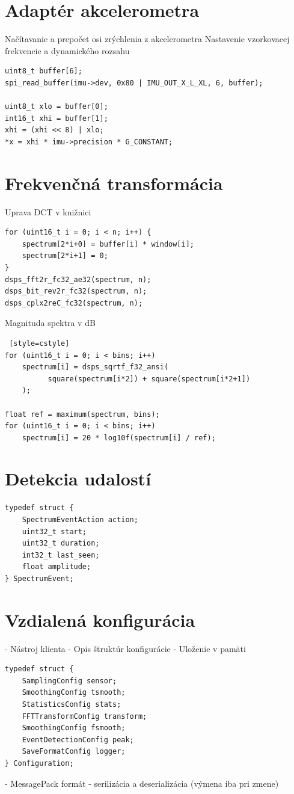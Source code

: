 \section{Adaptér akcelerometra}
Načítavanie a prepočet osi zrýchlenia z akcelerometra %
Nastavenie vzorkovacej frekvencie a dynamického rozsahu

\begin{lstlisting}[style=cstyle]
uint8_t buffer[6];
spi_read_buffer(imu->dev, 0x80 | IMU_OUT_X_L_XL, 6, buffer);
    
uint8_t xlo = buffer[0];
int16_t xhi = buffer[1];
xhi = (xhi << 8) | xlo;
*x = xhi * imu->precision * G_CONSTANT;
\end{lstlisting}


\section{Frekvenčná transformácia}
Uprava DCT v knižnici
\begin{lstlisting}[style=cstyle,caption=Transformácia do frekvenčnej domény vo funkcii process\_spectrum]
for (uint16_t i = 0; i < n; i++) {
	spectrum[2*i+0] = buffer[i] * window[i];
    spectrum[2*i+1] = 0;
}
dsps_fft2r_fc32_ae32(spectrum, n);
dsps_bit_rev2r_fc32(spectrum, n);
dsps_cplx2reC_fc32(spectrum, n);
\end{lstlisting}
 
Magnituda spektra v dB
\begin{lstlisting} [style=cstyle]         
for (uint16_t i = 0; i < bins; i++)
	spectrum[i] = dsps_sqrtf_f32_ansi(
          square(spectrum[i*2]) + square(spectrum[i*2+1])
    );

float ref = maximum(spectrum, bins);
for (uint16_t i = 0; i < bins; i++)
	spectrum[i] = 20 * log10f(spectrum[i] / ref);
\end{lstlisting}


\section{Detekcia udalostí}
\begin{lstlisting}[style=cstyle]
typedef struct {
    SpectrumEventAction action;
    uint32_t start;
    uint32_t duration;
    int32_t last_seen;
    float amplitude;
} SpectrumEvent;
\end{lstlisting}

\section{Vzdialená konfigurácia}
- Nástroj klienta
- Opis štruktúr konfigurácie
- Uloženie v pamäti
\begin{lstlisting}[style=cstyle]
typedef struct {
    SamplingConfig sensor;
    SmoothingConfig tsmooth;
    StatisticsConfig stats;
    FFTTransformConfig transform;
    SmoothingConfig fsmooth;
    EventDetectionConfig peak;
    SaveFormatConfig logger;
} Configuration;
\end{lstlisting}
- MessagePack formát - serilizácia a deserializácia (výmena iba pri zmene)

